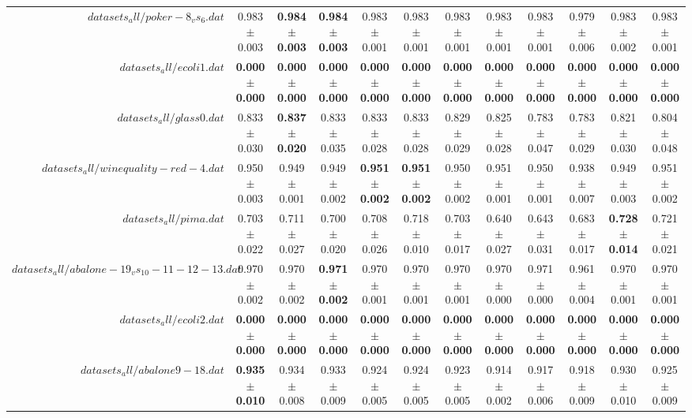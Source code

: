 \begin{table}[!ht]
{\begin{tabular}{r c c c c c c c c c c c}
$datasets_all/poker-8_vs_6.dat$ & 0.983 $\pm$ 0.003 & \textbf{0.984 $\pm$ 0.003} & \textbf{0.984 $\pm$ 0.003} & 0.983 $\pm$ 0.001 & 0.983 $\pm$ 0.001 & 0.983 $\pm$ 0.001 & 0.983 $\pm$ 0.001 & 0.983 $\pm$ 0.001 & 0.979 $\pm$ 0.006 & 0.983 $\pm$ 0.002 & 0.983 $\pm$ 0.001 \\
$datasets_all/ecoli1.dat$ & \textbf{0.000 $\pm$ 0.000} & \textbf{0.000 $\pm$ 0.000} & \textbf{0.000 $\pm$ 0.000} & \textbf{0.000 $\pm$ 0.000} & \textbf{0.000 $\pm$ 0.000} & \textbf{0.000 $\pm$ 0.000} & \textbf{0.000 $\pm$ 0.000} & \textbf{0.000 $\pm$ 0.000} & \textbf{0.000 $\pm$ 0.000} & \textbf{0.000 $\pm$ 0.000} & \textbf{0.000 $\pm$ 0.000} \\
$datasets_all/glass0.dat$ & 0.833 $\pm$ 0.030 & \textbf{0.837 $\pm$ 0.020} & 0.833 $\pm$ 0.035 & 0.833 $\pm$ 0.028 & 0.833 $\pm$ 0.028 & 0.829 $\pm$ 0.029 & 0.825 $\pm$ 0.028 & 0.783 $\pm$ 0.047 & 0.783 $\pm$ 0.029 & 0.821 $\pm$ 0.030 & 0.804 $\pm$ 0.048 \\
$datasets_all/winequality-red-4.dat$ & 0.950 $\pm$ 0.003 & 0.949 $\pm$ 0.001 & 0.949 $\pm$ 0.002 & \textbf{0.951 $\pm$ 0.002} & \textbf{0.951 $\pm$ 0.002} & 0.950 $\pm$ 0.002 & 0.951 $\pm$ 0.001 & 0.950 $\pm$ 0.001 & 0.938 $\pm$ 0.007 & 0.949 $\pm$ 0.003 & 0.951 $\pm$ 0.002 \\
$datasets_all/pima.dat$ & 0.703 $\pm$ 0.022 & 0.711 $\pm$ 0.027 & 0.700 $\pm$ 0.020 & 0.708 $\pm$ 0.026 & 0.718 $\pm$ 0.010 & 0.703 $\pm$ 0.017 & 0.640 $\pm$ 0.027 & 0.643 $\pm$ 0.031 & 0.683 $\pm$ 0.017 & \textbf{0.728 $\pm$ 0.014} & 0.721 $\pm$ 0.021 \\
$datasets_all/abalone-19_vs_10-11-12-13.dat$ & 0.970 $\pm$ 0.002 & 0.970 $\pm$ 0.002 & \textbf{0.971 $\pm$ 0.002} & 0.970 $\pm$ 0.001 & 0.970 $\pm$ 0.001 & 0.970 $\pm$ 0.001 & 0.970 $\pm$ 0.000 & 0.971 $\pm$ 0.000 & 0.961 $\pm$ 0.004 & 0.970 $\pm$ 0.001 & 0.970 $\pm$ 0.001 \\
$datasets_all/ecoli2.dat$ & \textbf{0.000 $\pm$ 0.000} & \textbf{0.000 $\pm$ 0.000} & \textbf{0.000 $\pm$ 0.000} & \textbf{0.000 $\pm$ 0.000} & \textbf{0.000 $\pm$ 0.000} & \textbf{0.000 $\pm$ 0.000} & \textbf{0.000 $\pm$ 0.000} & \textbf{0.000 $\pm$ 0.000} & \textbf{0.000 $\pm$ 0.000} & \textbf{0.000 $\pm$ 0.000} & \textbf{0.000 $\pm$ 0.000} \\
$datasets_all/abalone9-18.dat$ & \textbf{0.935 $\pm$ 0.010} & 0.934 $\pm$ 0.008 & 0.933 $\pm$ 0.009 & 0.924 $\pm$ 0.005 & 0.924 $\pm$ 0.005 & 0.923 $\pm$ 0.005 & 0.914 $\pm$ 0.002 & 0.917 $\pm$ 0.006 & 0.918 $\pm$ 0.009 & 0.930 $\pm$ 0.010 & 0.925 $\pm$ 0.009 \\

\end{tabular}}
\end{table}
